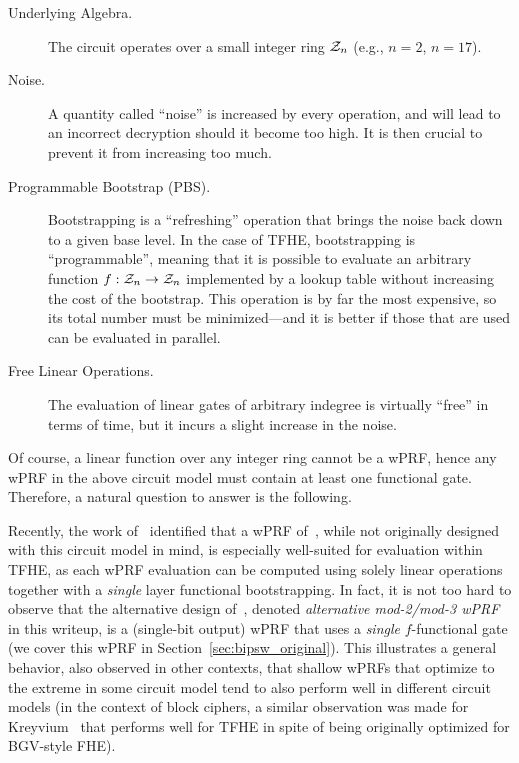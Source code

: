 \begin{description}
\item[Underlying Algebra.] The circuit operates over a small integer ring $\mathcal{Z}_n$ (e.g., $n=2$, $n=17$).
\item[Noise.] A quantity called ``noise'' is increased by every operation, and will lead to an incorrect decryption should it become too high. It is then crucial to prevent it from increasing too much.
\item[Programmable Bootstrap (PBS).] Bootstrapping is a ``refreshing'' operation that brings the noise back down to a given base level. In the case of {\sf TFHE}, bootstrapping is ``programmable'', meaning that it is possible to evaluate an arbitrary function $f:\mathcal{Z}_n\to\mathcal{Z}_n$ implemented by a lookup table without increasing the cost of the bootstrap. This operation is by far the most expensive, so its total number must be minimized---and it is better if those that are used can be evaluated in parallel.
\item[Free Linear Operations.] The evaluation of linear gates of arbitrary indegree is virtually ``free'' in terms of time, but it incurs a slight increase in the noise.
\end{description}

Of course, a linear function over any integer ring cannot be a wPRF, hence any wPRF in the above circuit model must contain at least one functional gate. Therefore, a natural question to answer is the following.


Recently, the work of~\cite{EC:ADDG24} identified that a wPRF of~\cite{TCC:BIPSW18}, while not originally designed with this circuit model in mind, is especially well-suited for evaluation within {\sf TFHE}, as each wPRF evaluation can be computed using solely linear operations together with a \emph{single} layer functional bootstrapping. In fact, it is not too hard to observe that the alternative design of~\cite{TCC:BIPSW18}, denoted \emph{alternative mod-2/mod-3 wPRF} in this writeup, is a (single-bit output) wPRF that uses a \emph{single} $f$-functional gate (we cover this wPRF in Section~\ref{sec:bipsw_original}). This illustrates a general behavior, also observed in other contexts, that shallow wPRFs that optimize to the extreme in some circuit model tend to also perform well in different circuit models (in the context of block ciphers, a similar observation was made for {\sf Kreyvium}~\cite{FSE:CCFLNP16} that performs well for {\sf TFHE} in spite of being originally optimized for BGV-style FHE).


